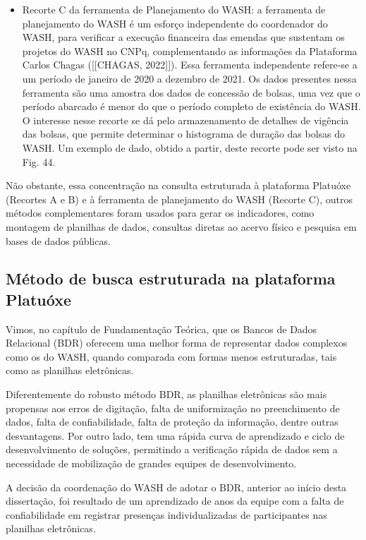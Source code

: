 \begin{itemize}
\item Recorte C da ferramenta de Planejamento do WASH: a ferramenta de planejamento do WASH é um esforço independente do coordenador do WASH, para verificar a execução financeira das emendas que sustentam os projetos do WASH no CNPq, complementando as informações da Plataforma Carlos Chagas  ([[CHAGAS, 2022]]). Essa ferramenta independente refere-se a um período de janeiro de 2020 a dezembro de 2021. Os dados presentes nessa ferramenta são uma amostra dos dados de concessão de bolsas, uma vez que o período abarcado é menor do que o período completo de existência do WASH. O interesse nesse recorte se dá pelo armazenamento de detalhes de vigência das bolsas, que permite determinar o histograma de duração das bolsas do WASH. Um exemplo de dado, obtido a partir, deste recorte pode ser visto na Fig. 44.
\end{itemize}

Não obstante, essa concentração na consulta estruturada à plataforma Platuóxe (Recortes A e B) e à ferramenta de planejamento do WASH (Recorte C), outros métodos complementares foram usados para gerar os indicadores, como montagem de planilhas de dados, consultas diretas ao acervo físico e pesquisa em bases de dados públicas.

\subsection[Método de busca estruturada na plataforma Platuóxe]{Método de busca estruturada na plataforma Platuóxe}\label{Método de busca estruturada na plataforma Platuóxe}
Vimos, no capítulo de Fundamentação Teórica, que os Bancos de Dados Relacional (BDR) oferecem uma melhor forma de representar dados complexos como os do WASH, quando comparada com formas menos estruturadas, tais como as planilhas eletrônicas.

Diferentemente do robusto método BDR, as planilhas eletrônicas são mais propensas aos erros de digitação, falta de uniformização no preenchimento de dados, falta de confiabilidade, falta de proteção da informação, dentre outras desvantagens. Por outro lado, tem uma rápida curva de aprendizado e ciclo de desenvolvimento de soluções, permitindo a verificação rápida de dados sem a necessidade de mobilização de grandes equipes de desenvolvimento.

A decisão da coordenação do WASH de adotar o BDR, anterior ao início desta dissertação, foi resultado de um aprendizado de anos da equipe com a falta de confiabilidade em registrar presenças individualizadas de participantes nas planilhas eletrônicas.


